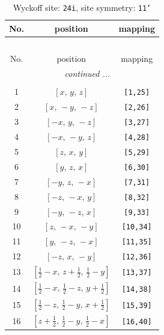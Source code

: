 \documentclass[fleqn,8pt]{jsarticle}
\begin{document}
\begin{longtable}{ccc}
\caption{Wyckoff site: {\tt 24i}, site symmetry: {\tt 11'}}
 \\
 \hline \hline
No. & position & mapping \\ \hline \endfirsthead

\multicolumn{2}{l}{\tablename\ \thetable{}} \\
 \hline \hline
No. & position & mapping \\ \hline \endhead

 \hline \hline
\multicolumn{2}{r}{\footnotesize\it continued ...} \\ \endfoot

 \hline \hline
\multicolumn{2}{r}{} \\ \endlastfoot

1 & $\left[ x,\, y,\, z \right]$ & {\tt [1,25]} \\ \hline
2 & $\left[ x,\, - y,\, - z \right]$ & {\tt [2,26]} \\ \hline
3 & $\left[ - x,\, y,\, - z \right]$ & {\tt [3,27]} \\ \hline
4 & $\left[ - x,\, - y,\, z \right]$ & {\tt [4,28]} \\ \hline
5 & $\left[ z,\, x,\, y \right]$ & {\tt [5,29]} \\ \hline
6 & $\left[ y,\, z,\, x \right]$ & {\tt [6,30]} \\ \hline
7 & $\left[ - y,\, z,\, - x \right]$ & {\tt [7,31]} \\ \hline
8 & $\left[ - z,\, - x,\, y \right]$ & {\tt [8,32]} \\ \hline
9 & $\left[ - y,\, - z,\, x \right]$ & {\tt [9,33]} \\ \hline
10 & $\left[ z,\, - x,\, - y \right]$ & {\tt [10,34]} \\ \hline
11 & $\left[ y,\, - z,\, - x \right]$ & {\tt [11,35]} \\ \hline
12 & $\left[ - z,\, x,\, - y \right]$ & {\tt [12,36]} \\ \hline
13 & $\left[ \frac{1}{2} - x,\, z + \frac{1}{2},\, \frac{1}{2} - y \right]$ & {\tt [13,37]} \\ \hline
14 & $\left[ \frac{1}{2} - x,\, \frac{1}{2} - z,\, y + \frac{1}{2} \right]$ & {\tt [14,38]} \\ \hline
15 & $\left[ \frac{1}{2} - z,\, \frac{1}{2} - y,\, x + \frac{1}{2} \right]$ & {\tt [15,39]} \\ \hline
16 & $\left[ z + \frac{1}{2},\, \frac{1}{2} - y,\, \frac{1}{2} - x \right]$ & {\tt [16,40]} \\ \hline

\end{longtable}
\end{document}
